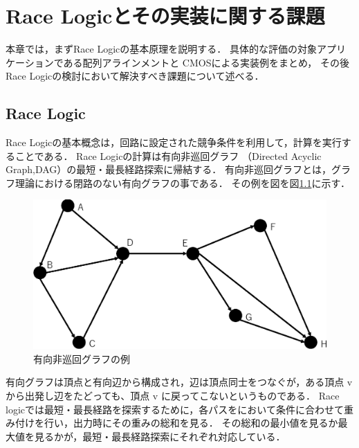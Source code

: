 \chapter{Race Logicとその実装に関する課題}
本章では，まずRace Logicの基本原理を説明する．
具体的な評価の対象アプリケーションである配列アラインメントと
CMOSによる実装例をまとめ，
その後Race Logicの検討において解決すべき課題について述べる．

\section{Race Logic}
Race Logicの基本概念は，回路に設定された競争条件を利用して，計算を実行することである．
Race Logicの計算は有向非巡回グラフ
（Directed Acyclic Graph,DAG）の最短・最長経路探索に帰結する．
有向非巡回グラフとは，グラフ理論における閉路のない有向グラフの事である．
その例を図を図\ref{fig:DAG}に示す．
\begin{figure}[t!]
\begin{center}
\includegraphics[keepaspectratio,scale=0.5]{fig/2/DAG.eps}
\caption{有向非巡回グラフの例}
\label{fig:DAG}
\end{center}
\end{figure}
有向グラフは頂点と有向辺から構成され，辺は頂点同士をつなぐが，ある頂点 v から出発し辺をたどっても、頂点 v に戻ってこないというものである．
Race logicでは最短・最長経路を探索するために，各パスをにおいて条件に合わせて重み付けを行い，出力時にその重みの総和を見る．
その総和の最小値を見るか最大値を見るかが，最短・最長経路探索にそれぞれ対応している．

